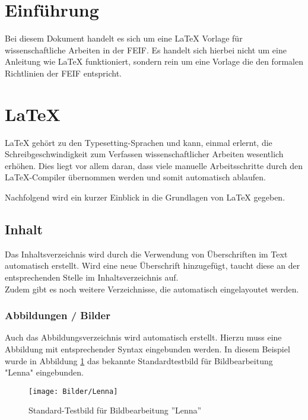 \section{Einführung}
\label{sec:einfuehrung}

Bei diesem Dokument handelt es sich um eine \LaTeX{} Vorlage für wissenschaftliche Arbeiten in der \acrfull{FEIF}.
Es handelt sich hierbei nicht um eine Anleitung wie \LaTeX{} funktioniert, sondern rein um eine Vorlage die den formalen Richtlinien der \acrshort{FEIF} entspricht.

\newpage
\section{\LaTeX}

\LaTeX{} gehört zu den Typesetting-Sprachen und kann, einmal erlernt, die Schreibgeschwindigkeit
zum Verfassen wissenschaftlicher Arbeiten wesentlich erhöhen. Dies liegt vor allem daran, dass viele
manuelle Arbeitsschritte durch den \LaTeX{}-Compiler übernommen werden und somit automatisch ablaufen.

Nachfolgend wird ein kurzer Einblick in die Grundlagen von \LaTeX{} gegeben.

\subsection{Inhalt}

Das Inhaltsverzeichnis wird durch die Verwendung von Überschriften im Text automatisch erstellt.
Wird eine neue Überschrift hinzugefügt, taucht diese an der entsprechenden Stelle im Inhaltsverzeichnis auf.\\

Zudem gibt es noch weitere Verzeichnisse, die automatisch eingelayoutet werden.

\subsubsection{Abbildungen / Bilder}

Auch das Abbildungsverzeichnis wird automatisch erstellt. Hierzu muss eine Abbildung mit
entsprechender Syntax eingebunden werden. In diesem Beispiel wurde in Abbildung
\ref{fig:Lenna} das bekannte Standardtestbild für Bildbearbeitung "Lenna" eingebunden.

\begin{figure}[H]
  \centering
  \texttt{[image: Bilder/Lenna]}
  \caption{Standard-Testbild für Bildbearbeitung ''Lenna''}
  \label{fig:Lenna}
\end{figure}

